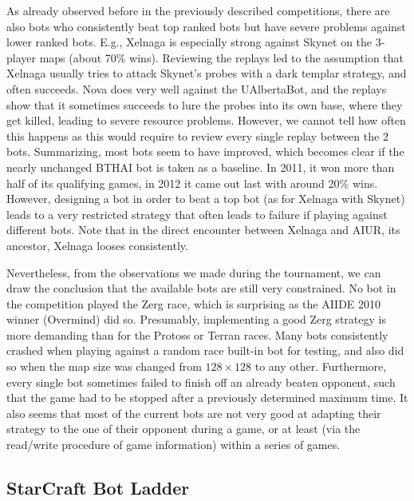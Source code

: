 \documentclass[journal]{IEEEtran}
\begin{document}
As already observed before in the previously described competitions,
there are also bots who consistently beat top ranked bots but have
severe problems against lower ranked bots. E.g., Xelnaga is especially
strong against Skynet on the 3-player maps (about 70\% wins). Reviewing
the replays led to the assumption that Xelnaga usually tries to attack
Skynet's probes with a dark templar strategy, and often succeeds. 
Nova does very well against the UAlbertaBot, and the replays show
that it sometimes succeeds to lure the probes into its own base, where
they get killed, leading to severe resource problems. However, we cannot
tell how often this happens as this would require to review every single
replay between the 2 bots. Summarizing, most bots seem to have improved,
which becomes clear if the nearly unchanged BTHAI bot is taken as a baseline.
In 2011, it won more than half of its qualifying games, in 2012 it came
out last with around 20\% wins. However, designing a bot in order to 
beat a top bot (as for Xelnaga with Skynet) leads to a very restricted
strategy that often leads to failure if playing against different bots.
Note that in the direct encounter between Xelnaga and AIUR, its ancestor,
Xelnaga looses consistently.

Nevertheless, from the observations we made during the tournament,
we can draw the conclusion that the available bots are still 
very constrained. No bot in the competition played the Zerg race,
which is surprising as the AIIDE 2010 winner (Overmind) did so.
Presumably, implementing a good Zerg strategy is more demanding
than for the Protoss or Terran races. Many bots consistently crashed
when playing against a random race built-in bot for testing, and
also did so when the map size was changed from $128\times 128$ to 
any other. Furthermore, every single bot sometimes failed to finish
off an already beaten opponent, such that the game had to be stopped
after a previously determined maximum time. It also seems that most of
the current bots are not very good at adapting their strategy to the
one of their opponent during a game, or at least (via the read/write
procedure of game information) within a series of games.



\subsection{StarCraft Bot Ladder}\label{sec:cig2011}
\end{document}
